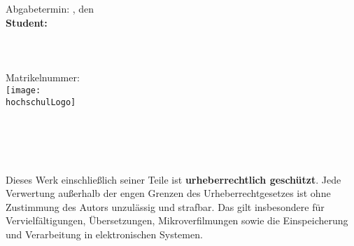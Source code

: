 \begin{titlepage}

\begin{center}

\Large{\studiengang}\\
\LARGE{\betreff}\\[4ex]

\huge{\textbf{\titel}}\\[1.5ex]
\Large{\textbf{\untertitel}}\\[4ex]

\normalsize
Abgabetermin: \abgabeOrt, den \abgabeTermin\\[3em]
\textbf{Student:}\\
\autorName\\
\autorAnschrift\\
\autorOrt\\
Matrikelnummer: \autorMatrikelnummer\\[5ex]


\texttt{[image: \\hochschulLogo]}\\[2ex]
\betriebName\\
\pruefer\\
\betriebAnschrift\\
\betriebOrt\\[5em]

\end{center}

\small
\noindent
Dieses Werk einschließlich seiner Teile ist \textbf{urheberrechtlich geschützt}.
Jede Verwertung außerhalb der engen Grenzen des Urheberrechtgesetzes ist ohne
Zustimmung des Autors unzulässig und strafbar. Das gilt insbesondere für
Vervielfältigungen, Übersetzungen, Mikroverfilmungen sowie die Einspeicherung
und Verarbeitung in elektronischen Systemen.

\end{titlepage}